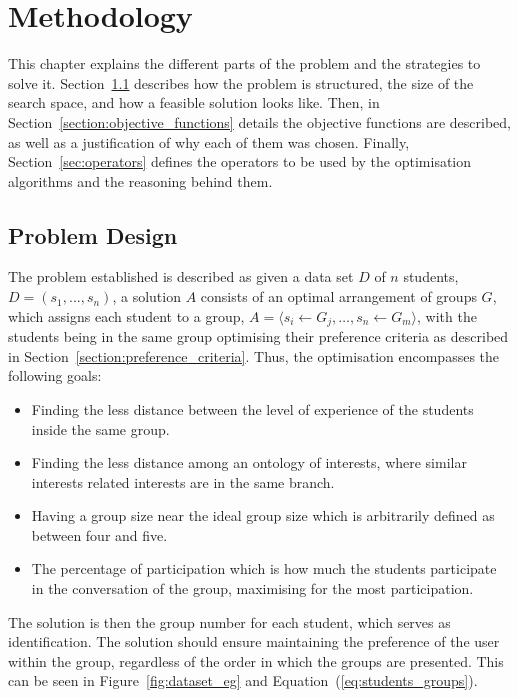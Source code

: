 \chapter{Methodology}
\label{chapter:chapter03}

This chapter explains the different parts of the problem and the strategies to solve it. Section~\ref{sec:Problem_design} describes how the problem is structured, the size of the search space, and how a feasible solution looks like. Then, in Section~\ref{section:objective_functions} details the objective functions are described, as well as a justification of why each of them was chosen. Finally, Section~\ref{sec:operators} defines the operators to be used by the optimisation algorithms and the reasoning behind them.\\

\section{Problem Design} \label{sec:Problem_design}

The problem established is described as given a data set $D$ of $n$ students, $D = (s_1,...,s_n)$, a solution $A$ consists of an optimal arrangement of groups $G$, which assigns each student to a group, $A = \langle s_i \leftarrow G_j, \ldots, s_n \leftarrow G_m \rangle$, with the students being in the same group optimising their preference criteria as described in Section~\ref{section:preference_criteria}. Thus, the optimisation encompasses the following goals:

\begin{itemize}
    \item Finding the less distance between the level of experience of the students inside the same group.
    \item Finding the less distance among an ontology of interests, where similar interests related interests are in the same branch.
    \item Having a group size near the ideal group size which is arbitrarily defined as between four and five.
    \item The percentage of participation which is how much the students participate in the conversation of the group, maximising for the most participation.
\end{itemize}

The solution is then the group number for each student, which serves as identification. The solution should ensure maintaining the preference of the user within the group, regardless of the order in which the groups are presented. This can be seen in Figure~\ref{fig:dataset_eg} and Equation~(\ref{eq:students_groups}).\\

